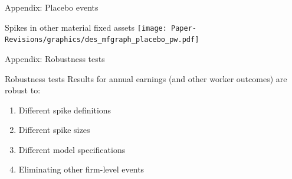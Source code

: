 \documentclass[aspectratio=169]{beamer}
\begin{document}


\begin{frame}
\begin{center}
{\Large Appendix: Placebo events}
\end{center}
\end{frame}

\begin{frame}{Spikes in other material fixed assets} \label{placebo}
\centering
\texttt{[image: Paper-Revisions/graphics/des\_mfgraph\_placebo\_pw.pdf]}
\end{frame}


\begin{frame}
\begin{center}
{\Large Appendix: Robustness tests}
\end{center}
\end{frame}

\begin{frame}{Robustness tests \hyperlink{additional}{}} \label{robustness}
Results for annual earnings (and other worker outcomes) are robust to: \bigskip
\begin{enumerate}
\item Different spike definitions 
\bigskip
\item Different spike sizes 
\bigskip
\item Different model specifications 
\bigskip
\item Eliminating other firm-level events 
\end{enumerate}
\end{frame}
\end{document}
